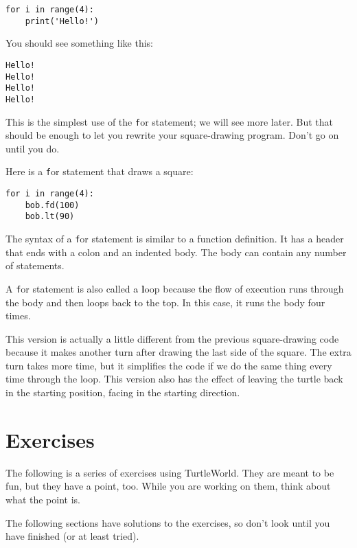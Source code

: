 \documentclass[
DIV=11,
fontsize=12,
twoside,
headinclude=false,
titlepage=firstiscover,
abstract=true,
headsepline=true,
footsepline=true,
chapterprefix=true, %
headings=big,
bibliography=totoc,%
captions=tableheading
]{scrbook}
\theoremstyle{definition}
\begin{document}
\begin{lstlisting}
for i in range(4):
    print('Hello!')
\end{lstlisting}
%
You should see something like this:

\begin{lstlisting}
Hello!
Hello!
Hello!
Hello!
\end{lstlisting}
%
This is the simplest use of the {\texttt for} statement; we will see
more later.  But that should be enough to let you rewrite your
square-drawing program.  Don't go on until you do.

Here is a {\texttt for} statement that draws a square:

\begin{lstlisting}
for i in range(4):
    bob.fd(100)
    bob.lt(90)
\end{lstlisting}
%
The syntax of a {\texttt for} statement is similar to a function
definition.  It has a header that ends with a colon and an indented
body.  The body can contain any number of statements.

A {\texttt for} statement is also called a {\textbf loop} because
the flow of execution runs through the body and then loops back
to the top.  In this case, it runs the body four times.

This version is actually a little different from the previous
square-drawing code because it makes another turn after
drawing the last side of the square.  The extra turn takes
more time, but it simplifies the code if we do the same thing
every time through the loop.  This version also has the effect
of leaving the turtle back in the starting position, facing in
the starting direction.

\section{Exercises}

The following is a series of exercises using TurtleWorld.  They
are meant to be fun, but they have a point, too.  While you are
working on them, think about what the point is.

The following sections have solutions to the exercises, so
don't look until you have finished (or at least tried).
\end{document}
